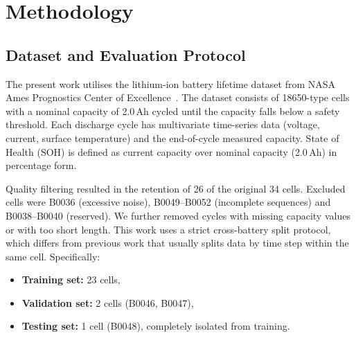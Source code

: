 \section{Methodology}
\label{sec:method}

\subsection{Dataset and Evaluation Protocol}
\label{subsec:dataset}

The present work utilises the lithium-ion battery lifetime dataset from NASA
Ames Prognostics Center of Excellence~\cite{saha2007}. The dataset consists of
18650-type cells with a nominal capacity of 2.0\,Ah cycled until the capacity
falls below a safety threshold. Each discharge cycle has multivariate
time-series data (voltage, current, surface temperature) and the end-of-cycle
measured capacity. State of Health (SOH) is defined as current capacity over
nominal capacity (2.0\,Ah) in percentage form.

Quality filtering resulted in the retention of 26 of the original 34 cells.
Excluded cells were B0036 (excessive noise), B0049--B0052 (incomplete
sequences) and B0038--B0040 (reserved). We further removed cycles with missing
capacity values or with too short length. This work uses a strict cross-battery
split protocol, which differs from previous work that usually splits data by
time step within the same cell. Specifically:
\begin{itemize}
  \setlength{\itemsep}{0pt}\setlength{\parskip}{0pt}
  \item \textbf{Training set:} 23 cells,
  \item \textbf{Validation set:} 2 cells (B0046, B0047),
  \item \textbf{Testing set:} 1 cell (B0048), completely isolated from
        training.
\end{itemize}

